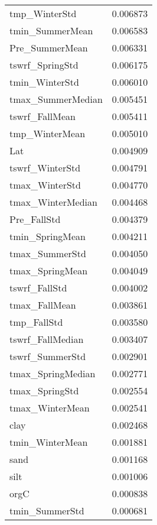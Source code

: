 \begin{tabular}{lr}
tmp_WinterStd & 0.006873 \\
tmin_SummerMean & 0.006583 \\
Pre_SummerMean & 0.006331 \\
tswrf_SpringStd & 0.006175 \\
tmin_WinterStd & 0.006010 \\
tmax_SummerMedian & 0.005451 \\
tswrf_FallMean & 0.005411 \\
tmp_WinterMean & 0.005010 \\
Lat & 0.004909 \\
tswrf_WinterStd & 0.004791 \\
tmax_WinterStd & 0.004770 \\
tmax_WinterMedian & 0.004468 \\
Pre_FallStd & 0.004379 \\
tmin_SpringMean & 0.004211 \\
tmax_SummerStd & 0.004050 \\
tmax_SpringMean & 0.004049 \\
tswrf_FallStd & 0.004002 \\
tmax_FallMean & 0.003861 \\
tmp_FallStd & 0.003580 \\
tswrf_FallMedian & 0.003407 \\
tswrf_SummerStd & 0.002901 \\
tmax_SpringMedian & 0.002771 \\
tmax_SpringStd & 0.002554 \\
tmax_WinterMean & 0.002541 \\
clay & 0.002468 \\
tmin_WinterMean & 0.001881 \\
sand & 0.001168 \\
silt & 0.001006 \\
orgC & 0.000838 \\
tmin_SummerStd & 0.000681 \\
\bottomrule
\end{tabular}
